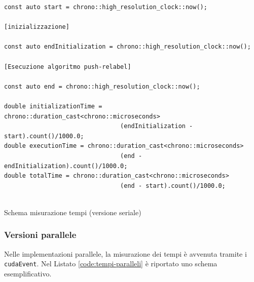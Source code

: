                 \begin{listing}[ht]
                \begin{verbatim}
const auto start = chrono::high_resolution_clock::now();

[inizializzazione]

const auto endInitialization = chrono::high_resolution_clock::now();

[Esecuzione algoritmo push-relabel]

const auto end = chrono::high_resolution_clock::now();

double initializationTime = chrono::duration_cast<chrono::microseconds>
                                (endInitialization - start).count()/1000.0;
double executionTime = chrono::duration_cast<chrono::microseconds>
                                (end - endInitialization).count()/1000.0;
double totalTime = chrono::duration_cast<chrono::microseconds>
                                (end - start).count()/1000.0;


                \end{verbatim}
                \caption{Schema misurazione tempi (versione seriale)}\label{code:tempi-seriali}
                \end{listing}   

            \subsubsection*{Versioni parallele}
            
                Nelle implementazioni parallele, la misurazione dei tempi è avvenuta tramite i \verb|cudaEvent|. Nel Listato \ref{code:tempi-paralleli} è riportato uno schema esemplificativo.

